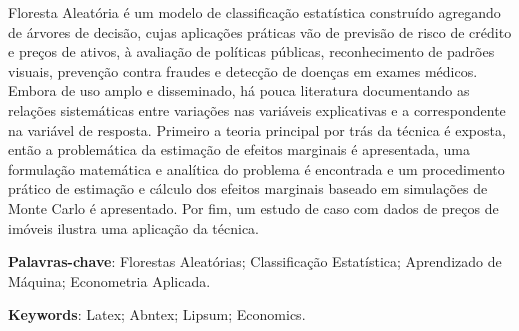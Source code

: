 %
%

\begin{resumo}

Floresta Aleatória é um modelo de classificação estatística construído agregando de árvores de decisão, cujas aplicações práticas vão de previsão de risco de crédito e preços de ativos, à avaliação de políticas públicas, reconhecimento de padrões visuais, prevenção contra fraudes e detecção de doenças em exames médicos. Embora de uso amplo e disseminado, há pouca literatura documentando as relações sistemáticas entre variações nas variáveis explicativas e a correspondente na variável de resposta. Primeiro a teoria principal por trás da técnica é exposta, então a problemática da estimação de efeitos marginais é apresentada, uma formulação matemática e analítica do problema é encontrada e um procedimento prático de estimação e cálculo dos efeitos marginais baseado em simulações de Monte Carlo é apresentado. Por fim, um estudo de caso com dados de preços de imóveis ilustra uma aplicação da técnica. 


\textbf{Palavras-chave}: Florestas Aleatórias; Classificação Estatística; Aprendizado de Máquina; Econometria Aplicada. %
\end{resumo}


\begin{resumo}[ABSTRACT] %
	


\textbf{Keywords}: Latex; Abntex; Lipsum; Economics. 	
\end{resumo}



